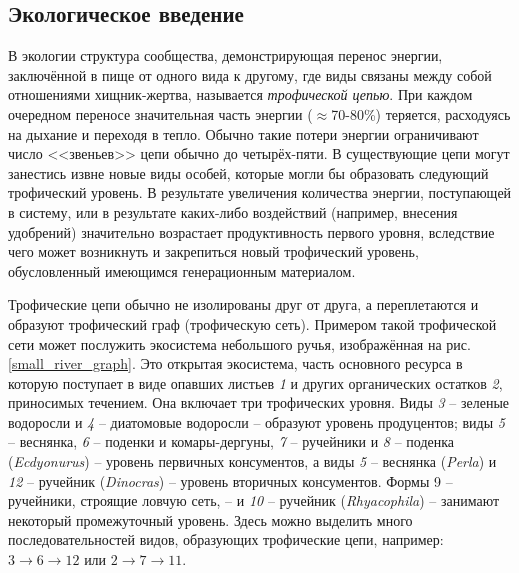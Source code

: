 \subsection{Экологическое введение}
    В экологии структура сообщества, демонстрирующая перенос энергии, заключённой в пище от одного вида к другому, где виды связаны между собой отношениями хищник-жертва, называется \textit{трофической цепью}. При каждом очередном переносе значительная часть энергии (\( \approx \)70-80\%) теряется, расходуясь на дыхание и переходя в тепло. Обычно такие потери энергии ограничивают число <<звеньев>> цепи обычно до четырёх-пяти. В существующие цепи могут занестись извне новые виды особей, которые могли бы образовать следующий трофический уровень. В результате увеличения количества энергии, поступающей в систему, или в результате каких-либо воздействий (например, внесения удобрений) значительно возрастает продуктивность первого уровня, вследствие чего может возникнуть и закрепиться новый трофический уровень, обусловленный имеющимся генерационным материалом.
    
    Трофические цепи обычно не изолированы друг от друга, а переплетаются и образуют трофический граф (трофическую сеть). Примером такой трофической сети может послужить экосистема небольшого ручья\cite{jones_river}, изображённая на рис. \ref{small_river_graph}.
    Это открытая экосистема, часть основного ресурса в которую поступает в виде опавших листьев \textit{1} и других органических остатков \textit{2}, приносимых течением. Она включает три трофических уровня. Виды \textit{3} -- зеленые водоросли и \textit{4} -- диатомовые водоросли -- образуют уровень продуцентов; виды \textit{5} -- веснянка, \textit{6} -- поденки и комары-дергуны, \textit{7} -- ручейники и \textit{8} -- поденка (\textit{Ecdyonurus}) -- уровень первичных консументов, а виды \textit{5} -- веснянка (\textit{Perla}) и \textit{12} -- ручейник (\textit{Dinocras}) -- уровень вторичных консументов. Формы 9 -- ручейники, строящие ловчую сеть, -- и \textit{10} -- ручейник (\textit{Rhyacophila}) -- занимают некоторый промежуточный уровень. Здесь можно выделить много последовательностей видов, образующих трофические цепи, например: \(3 \to 6 \to 12\) или \( 2 \to 7 \to 11 \). 

